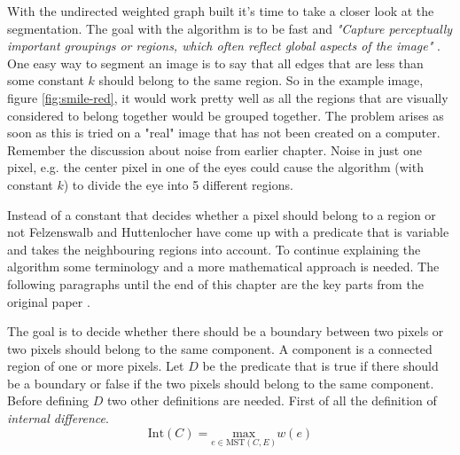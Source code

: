 With the undirected weighted graph built it's time to take a closer look at the
segmentation. The goal with the algorithm is to be fast and {\em "Capture perceptually
important groupings or regions, which often reflect global aspects of the image"} \cite{felzenszwalb2004}.
One easy way to segment an image is to say that all edges that are less than some
constant \(k\) should belong to the same region. So in the example image, figure \ref{fig:smile-red},
it would work pretty well as all the regions that are visually considered to belong
together would be grouped together. The problem arises as soon as this is tried
on a "real" image that has not been created on a computer. Remember the discussion
about noise from earlier chapter. Noise in just one pixel, e.g. the center
pixel in one of the eyes could cause the algorithm (with constant \(k\)) to divide
the eye into 5 different regions.

Instead of a constant that decides whether a pixel should belong to a region or
not Felzenswalb and Huttenlocher have come up with a predicate that is variable
and takes the neighbouring regions into account. To continue explaining the
algorithm some terminology and a more mathematical approach is needed. The following
paragraphs until the end of this chapter are the key parts from the original paper \cite[ch. 3.1 Pairwise
Region Comparison Predicate]{felzenszwalb2004}.

The goal is to decide whether there should be a boundary between two pixels or
two pixels should belong to the same component. A component is a connected region of one
or more pixels. Let \(D\) be the predicate that is true if there should be a
boundary or false if the two pixels should belong to the same component. Before
defining \(D\) two other definitions are needed. First of all the definition
of {\em internal difference}.
\begin{equation}
    \label{eq:internalDifference}
    \text{Int}(C) = \underset{e \in \text{MST}(C,E)}{\text{max}} w(e)
\end{equation}

